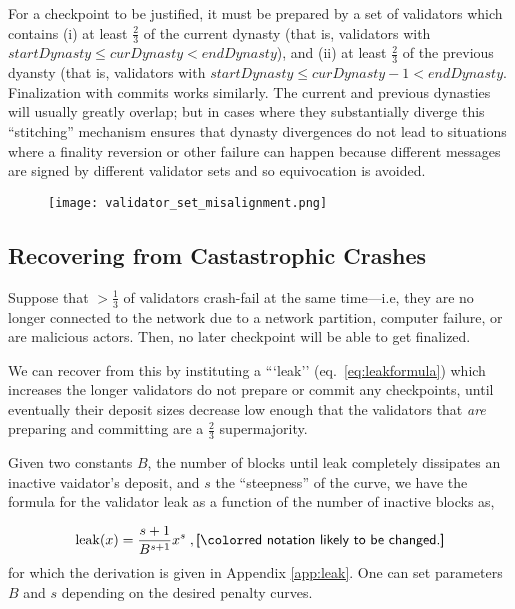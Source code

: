 \documentclass[12pt, final]{article}
\begin{document}
For a checkpoint to be justified, it must be prepared by a set of validators which contains (i) at least $\frac{2}{3}$ of the current dynasty (that is, validators with $startDynasty \le curDynasty < endDynasty$), and (ii) at least $\frac{2}{3}$ of the previous dyansty (that is, validators with $startDynasty \le curDynasty - 1 < endDynasty$. Finalization with commits works similarly. The current and previous dynasties will usually greatly overlap; but in cases where they substantially diverge this ``stitching'' mechanism ensures that dynasty divergences do not lead to situations where a finality reversion or other failure can happen because different messages are signed by different validator sets and so equivocation is avoided.

\begin{figure}[h!tb]
\centering
\texttt{[image: validator\_set\_misalignment.png]}
\caption{}
\label{fig:dynamic}
\end{figure}

\subsection{Recovering from Castastrophic Crashes}
\label{sect:leak}

Suppose that $>\frac{1}{3}$ of validators crash-fail at the same time---i.e, they are no longer connected to the network due to a network partition, computer failure, or are malicious actors. Then, no later checkpoint will be able to get finalized.

We can recover from this by instituting a ```leak'' (eq.~\ref{eq:leakformula}) which increases the longer validators do not prepare or commit any checkpoints, until eventually their deposit sizes decrease low enough that the validators that \textit{are} preparing and committing are a $\frac{2}{3}$ supermajority.


Given two constants $B$, the number of blocks until leak completely dissipates an inactive vaidator's deposit, and $s$ the ``steepness'' of the curve, we have the formula for the validator leak as a function of the number of inactive blocks as,

\begin{equation}
    \operatorname{leak}(x) = \frac{s + 1}{B^{s + 1}} x^s \; , \textnormal{\todo{notation likely to be changed.}}
    \label{eq:leakformula}
\end{equation}
for which the derivation is given in Appendix \ref{app:leak}.  One can set parameters $B$ and $s$ depending on the desired penalty curves.
\end{document}
